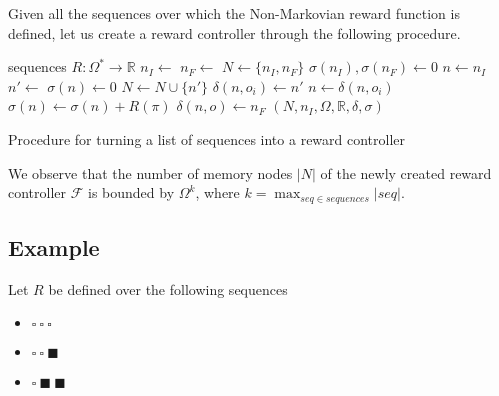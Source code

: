 Given all the sequences over which the Non-Markovian reward function is defined, let us create a reward controller through the following procedure.
\begin{algorithm}[H]
	\begin{algorithmic}[1]
		\Require sequences
		\Require $R : \Omega^* \to \mathbb{R}$
		\State $n_I \gets $   \label{l:initial_node}
		\State $n_F \gets $    \label{l:dump_node}
		\State $N\gets\{n_I,n_F\}$
		\State $\sigma(n_I),\sigma(n_F)\gets 0$ 
			\State $n \gets n_I$
					\State $n'\gets$  
					\State $\sigma(n) \gets 0$
					\State $N \gets N \cup \{n'\}$		
					\State $\delta(n,o_i) \gets n'$	\label{l:set_transition}
				\EndIf 
				\State $n \gets \delta(n,o_i)$     
			\EndFor
			\State $\sigma(n) \gets \sigma(n) + R(\pi)$  \label{l:set_reward}
		\EndFor
		 
				 
					\State $\delta(n,o) \gets n_F$ \label{l:self_loop}
				\EndIf
			\EndFor
		\EndFor
		\State \Return $(N,n_I,\Omega,\mathbb{R},\delta,\sigma)$
		\EndProcedure
	\end{algorithmic}
	\caption{Procedure for turning a list of sequences into a reward controller}
	\label{procedure:into_reward_controller}
\end{algorithm}



We observe that the number of memory nodes $|N|$ of the newly created reward controller $\mathcal{F}$ is bounded by $\Omega^k$, where $k=\max_{seq\in sequences} |seq|$.\\


\subsection*{Example}
Let $R$ be defined over the following sequences
\begin{itemize}
	\item $\square\ \square\ \square\ $
	\item $\square\ \square\ \blacksquare\ $
	\item $\square\ \blacksquare\ \blacksquare\ $
\end{itemize}

